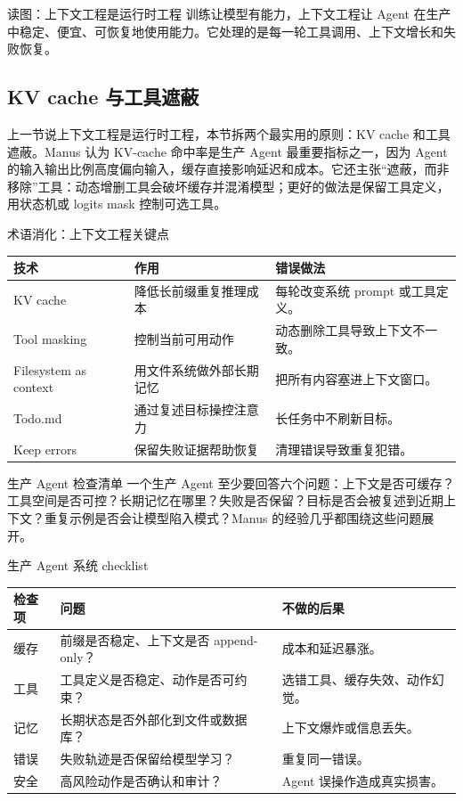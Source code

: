 \documentclass[a4paper]{article}
\begin{document}
\begin{knowledgebox}{读图：上下文工程是运行时工程}
训练让模型有能力，上下文工程让 Agent 在生产中稳定、便宜、可恢复地使用能力。它处理的是每一轮工具调用、上下文增长和失败恢复。
\end{knowledgebox}

\subsection{KV cache 与工具遮蔽}

上一节说上下文工程是运行时工程，本节拆两个最实用的原则：KV cache 和工具遮蔽。Manus 认为 KV-cache 命中率是生产 Agent 最重要指标之一，因为 Agent 的输入输出比例高度偏向输入，缓存直接影响延迟和成本。它还主张“遮蔽，而非移除”工具：动态增删工具会破坏缓存并混淆模型；更好的做法是保留工具定义，用状态机或 logits mask 控制可选工具。

\begin{knowledgebox}{术语消化：上下文工程关键点}
\begin{tabularx}{\textwidth}{p{}p{}X}
\toprule
技术 & 作用 & 错误做法 \\
\midrule
KV cache & 降低长前缀重复推理成本 & 每轮改变系统 prompt 或工具定义。 \\
Tool masking & 控制当前可用动作 & 动态删除工具导致上下文不一致。 \\
Filesystem as context & 用文件系统做外部长期记忆 & 把所有内容塞进上下文窗口。 \\
Todo.md & 通过复述目标操控注意力 & 长任务中不刷新目标。 \\
Keep errors & 保留失败证据帮助恢复 & 清理错误导致重复犯错。 \\
\bottomrule
\end{tabularx}
\end{knowledgebox}

\begin{importantbox}{生产 Agent 检查清单}
一个生产 Agent 至少要回答六个问题：上下文是否可缓存？工具空间是否可控？长期记忆在哪里？失败是否保留？目标是否会被复述到近期上下文？重复示例是否会让模型陷入模式？Manus 的经验几乎都围绕这些问题展开。
\end{importantbox}

\begin{knowledgebox}{生产 Agent 系统 checklist}
\begin{tabularx}{\textwidth}{p{}p{}X}
\toprule
检查项 & 问题 & 不做的后果 \\
\midrule
缓存 & 前缀是否稳定、上下文是否 append-only？ & 成本和延迟暴涨。 \\
工具 & 工具定义是否稳定、动作是否可约束？ & 选错工具、缓存失效、动作幻觉。 \\
记忆 & 长期状态是否外部化到文件或数据库？ & 上下文爆炸或信息丢失。 \\
错误 & 失败轨迹是否保留给模型学习？ & 重复同一错误。 \\
安全 & 高风险动作是否确认和审计？ & Agent 误操作造成真实损害。 \\
\bottomrule
\end{tabularx}
\end{knowledgebox}
\end{document}
